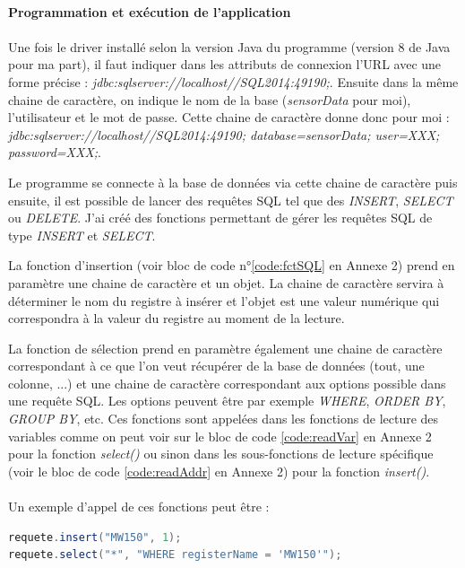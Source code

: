         \paragraph{Programmation et exécution de l'application}
            \paragraph*{}
            Une fois le driver installé selon la version Java du programme (version 8 de Java pour ma part), il faut indiquer dans les attributs de connexion l'URL avec une forme précise : \textit{jdbc:sqlserver://localhost//SQL2014:49190;}. Ensuite dans la même chaine de caractère, on indique le nom de la base (\textit{sensorData} pour moi), l'utilisateur et le mot de passe. Cette chaine de caractère donne donc pour moi : \textit{jdbc:sqlserver://localhost//SQL2014:49190; database=sensorData; user=XXX; password=XXX;}.
            
            Le programme se connecte à la base de données via cette chaine de caractère puis ensuite, il est possible de lancer des requêtes SQL tel que des \textit{INSERT}, \textit{SELECT} ou \textit{DELETE}. J'ai créé des fonctions permettant de gérer les requêtes SQL de type \textit{INSERT} et \textit{SELECT}.
            
            La fonction d'insertion (voir bloc de code n°\ref{code:fctSQL} en Annexe 2) prend en paramètre une chaine de caractère et un objet. La chaine de caractère servira à déterminer le nom du registre à insérer et l'objet est une valeur numérique qui correspondra à la valeur du registre au moment de la lecture.
            
            La fonction de sélection prend en paramètre également une chaine de caractère correspondant à ce que l'on veut récupérer de la base de données (tout, une colonne, ...) et une chaine de caractère correspondant aux options possible dans une requête SQL.
            Les options peuvent être par exemple \textit{WHERE}, \textit{ORDER BY}, \textit{GROUP BY}, etc. Ces fonctions sont appelées dans les fonctions de lecture des variables comme on peut voir sur le bloc de code \ref{code:readVar} en Annexe 2 pour la fonction \textit{select()} ou sinon dans les sous-fonctions de lecture spécifique (voir le bloc de code \ref{code:readAddr} en Annexe 2) pour la fonction \textit{insert()}.
            
            
            
            \paragraph*{}
            Un exemple d'appel de ces fonctions peut être :
            \begin{lstlisting}[language=Java, caption=Exemple d'utilisation des fonctions SQL]
requete.insert("MW150", 1);
requete.select("*", "WHERE registerName = 'MW150'");\end{lstlisting}
            
